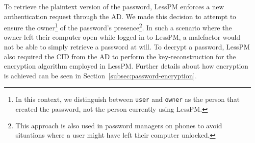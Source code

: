 To retrieve the plaintext version of the password, LessPM enforces a new
authentication request through the AD\@.
We made this decision to attempt to ensure the owner\footnote{
  In this context, we distinguish between \texttt{user} and \texttt{owner}
  as the person that created the password, not the person currently using
  LessPM.
} of
the password's presence\footnote{
  This approach is also used in password managers on phones to avoid situations
  where a user might have left their computer unlocked.
}.
In such a scenario where the owner left their computer open while logged in to
LessPM, a malefactor would not be able to simply retrieve a password at will.
To decrypt a password, LessPM also required the CID from the AD to perform
the key-reconstruction for the encryption algorithm employed in LessPM\@.
Further details about how encryption is achieved can be seen in
Section~\ref{subsec:password-encryption}.